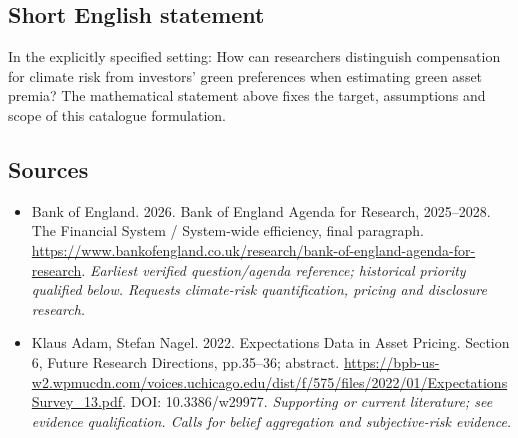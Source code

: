 \documentclass[11pt]{article}
\begin{document}
\subsection{Short English statement}
In the explicitly specified setting: How can researchers distinguish compensation for climate risk from investors’ green preferences when estimating green asset premia? The mathematical statement above fixes the target, assumptions and scope of this catalogue formulation.

\subsection{Sources}
\begin{itemize}\raggedright
\item[\textnormal{[S1]}]\hypertarget{source:30007600:1}{} Bank of England. 2026. Bank of England Agenda for Research, 2025–2028. The Financial System / System-wide efficiency, final paragraph.
\url{https://www.bankofengland.co.uk/research/bank-of-england-agenda-for-research}.
{\small\textit{Earliest verified question/agenda reference; historical priority qualified below. Requests climate-risk quantification, pricing and disclosure research.}}

\item[\textnormal{[S2]}]\hypertarget{source:30007600:2}{} Klaus Adam, Stefan Nagel. 2022. Expectations Data in Asset Pricing. Section 6, Future Research Directions, pp.35–36; abstract.
\url{https://bpb-us-w2.wpmucdn.com/voices.uchicago.edu/dist/f/575/files/2022/01/ExpectationsSurvey_13.pdf}.
DOI: 10.3386/w29977.
{\small\textit{Supporting or current literature; see evidence qualification. Calls for belief aggregation and subjective-risk evidence.}}
\end{itemize}
\end{document}
